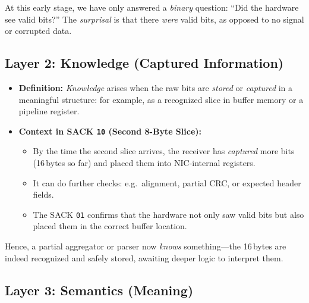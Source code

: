 \documentclass[../HFT-main.tex]{subfiles}
\begin{document}
\vspace{6pt}

\noindent
At this early stage, we have only answered a \emph{binary} question: ``Did the hardware see valid bits?'' The \emph{surprisal} is that there \emph{were} valid bits, as opposed to no signal or corrupted data.

\subsection*{Layer 2: Knowledge (Captured Information)}

\begin{itemize}
  \item \textbf{Definition:} \emph{Knowledge} arises when the raw bits are \emph{stored} or \emph{captured} in a meaningful structure: for example, as a recognized slice in buffer memory or a pipeline register. 
  \item \textbf{Context in SACK \texttt{10} (Second 8-Byte Slice):}
  \begin{itemize}
    \item By the time the second slice arrives, the receiver has \emph{captured} more bits (16\,bytes so far) and placed them into NIC-internal registers.
    \item It can do further checks: e.g.\ alignment, partial CRC, or expected header fields.
    \item The SACK \texttt{01} confirms that the hardware not only saw valid bits but also placed them in the correct buffer location.
  \end{itemize}
\end{itemize}

\vspace{6pt}

\noindent
Hence, a partial aggregator or parser now \emph{knows} something---the 16\,bytes are indeed recognized and safely stored, awaiting deeper logic to interpret them.

\subsection*{Layer 3: Semantics (Meaning)}
\end{document}
